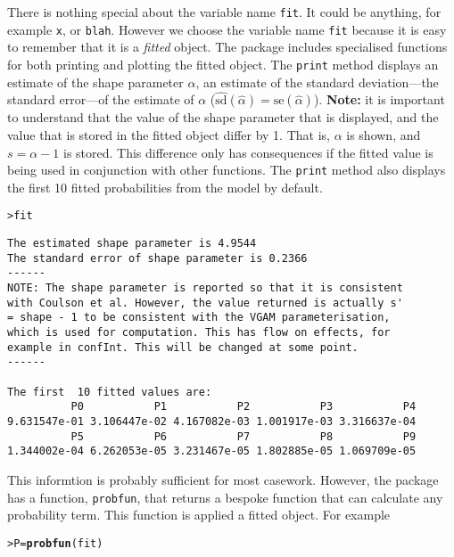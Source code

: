 \documentclass{article}\usepackage[]{graphicx}\usepackage[]{xcolor}
\makeatletter
\newcommand{\hlstd}[1]{\textcolor[rgb]{0.345,0.345,0.345}{#1}}%
\newcommand{\hlkwb}[1]{\textcolor[rgb]{0.69,0.353,0.396}{#1}}%
\newcommand{\hlkwd}[1]{\textcolor[rgb]{0.737,0.353,0.396}{\textbf{#1}}}%
\newenvironment{kframe}{%
 \def\at@end@of@kframe{}%
 \ifinner\ifhmode%
  \def\at@end@of@kframe{\end{minipage}}%
  \begin{minipage}{\columnwidth}%
 \fi\fi%
 \def\FrameCommand##1{\hskip\@totalleftmargin \hskip-\fboxsep
 \colorbox{shadecolor}{##1}\hskip-\fboxsep
     \hskip-\linewidth \hskip-\@totalleftmargin \hskip\columnwidth}%
 \MakeFramed {\advance\hsize-\width
   \@totalleftmargin\z@ \linewidth\hsize
   \@setminipage}}%
 {\par\unskip\endMakeFramed%
 \at@end@of@kframe}
\newenvironment{knitrout}{}{} %
\newcommand{\rcode}[1]{\lstinline[language=R,basicstyle=\normalsize\ttfamily]!#1!}
\makeatother
\begin{document}
There is nothing special about the variable name \rcode{fit}. It could be anything, for example \rcode{x}, or \rcode{blah}. However we choose the variable name \rcode{fit} because it is easy to remember that it is a \emph{fitted} object. The package includes specialised functions for both printing and plotting the fitted object. The \rcode{print} method displays an estimate of the shape parameter $\alpha$, an estimate of the standard deviation---the standard error---of the estimate of $\alpha$ ($\widehat{\mathrm{sd}}(\hat{\alpha})=\mathrm{se}(\hat{\alpha})$). \textbf{Note:} it is important to understand that the value of the shape parameter that is displayed, and the value that is stored in the fitted object differ by 1. That is, $\alpha$ is shown, and $s = \alpha - 1$ is stored. This difference only has consequences if the fitted value is being used in conjunction with other functions. The \rcode{print} method also displays the first 10 fitted probabilities from the model by default.
\begin{knitrout}
\color{fgcolor}\begin{kframe}
\begin{alltt}
\hlstd{> }\hlstd{fit}
\end{alltt}
\begin{verbatim}
The estimated shape parameter is 4.9544 
The standard error of shape parameter is 0.2366 
------
NOTE: The shape parameter is reported so that it is consistent
with Coulson et al. However, the value returned is actually s'
= shape - 1 to be consistent with the VGAM parameterisation,
which is used for computation. This has flow on effects, for
example in confInt. This will be changed at some point.
------

The first  10 fitted values are:
          P0           P1           P2           P3           P4 
9.631547e-01 3.106447e-02 4.167082e-03 1.001917e-03 3.316637e-04 
          P5           P6           P7           P8           P9 
1.344002e-04 6.262053e-05 3.231467e-05 1.802885e-05 1.069709e-05 
\end{verbatim}
\end{kframe}
\end{knitrout}
This informtion is probably sufficient for most casework. However, the package has a function, \rcode{probfun}, that returns a bespoke function that can calculate any probability term. This function is applied a fitted object. For example
\begin{knitrout}
\color{fgcolor}\begin{kframe}
\begin{alltt}
\hlstd{> }\hlstd{P} \hlkwb{=} \hlkwd{probfun}\hlstd{(fit)}
\end{alltt}
\end{kframe}
\end{knitrout}
\end{document}
